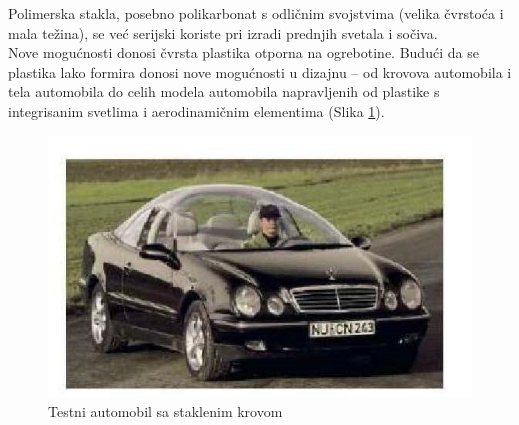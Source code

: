 \documentclass[a4paper]{article}
\begin{document}
{Polimerska stakla, posebno polikarbonat s odličnim svojstvima (velika čvrstoća i mala težina), se već serijski koriste pri izradi prednjih svetala i sočiva. \\

Nove mogućnosti donosi čvrsta plastika otporna na ogrebotine. Budući da se plastika lako formira donosi nove mogućnosti u dizajnu – od krovova automobila i tela automobila do celih modela automobila napravljenih od plastike s integrisanim svetlima i aerodinamičnim elementima (Slika \ref{slika_7}).

\begin{figure}[H]
    \centering
    \includegraphics[width=.5\textwidth]{slika 7.jpg}
    \caption{Testni automobil sa staklenim krovom}
    \label{slika_7}
\end{figure}

\newpage

}
\end{document}
